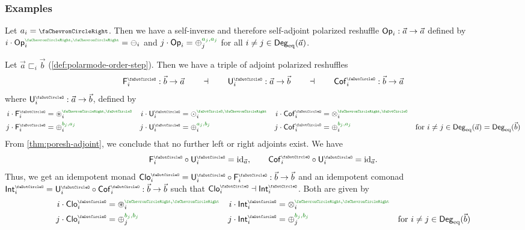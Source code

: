 \documentclass[a4paper]{memoir}
\begin{document}
\subsubsection{Examples}
\begin{example} \label{ex:poresh-op}
	Let $a_i = \ypolar$.
	Then we have a self-inverse and therefore self-adjoint polarized reshuffle ${\mathsf{Op}}_i : \vec a \to \vec a$ defined by $i \cdot \Op_i\pmrhom{\ypolar}{\ypolar} = \negpol_i$ and $j \cdot \Op_i = \pospol_j\pmrhom{a_j}{a_j}$ for all $i \neq j \in {\mathsf{Deg}_{\mathrm{eq}}}(\vec a)$.
\end{example}
\begin{example} \label{ex:poresh-sym}
	Let $\vec a \sqsubset_i \vec b$ (\cref{def:polarmode-order-step}).
	Then we have a triple of adjoint polarized reshuffles
	\[
		\Fsymresh_i : \vec b \to \vec a
		\qquad\dashv\qquad
		\Usymresh_i : \vec a \to \vec b
		\qquad\dashv\qquad
		\Csymresh_i : \vec b \to \vec a
	\]
	where $\Usymresh_i : \vec a \to \vec b$, defined by
	\begin{align*}
		i \cdot \Fsymresh_i &= \isopol_i\pmrhom{\ypolar}{\npolar}
		& i \cdot \Usymresh_i &= \nonpol_i\pmrhom{\npolar}{\ypolar}
		& i \cdot \Csymresh_i &= \mixpol_i\pmrhom{\ypolar}{\npolar}
		\\
		j \cdot \Fsymresh_i &= \pospol_i\pmrhom{b_j}{a_j}
		& j \cdot \Usymresh_i &= \pospol_i\pmrhom{a_j}{b_j}
		& j \cdot \Csymresh_i &= \pospol_i\pmrhom{b_j}{a_j}
		& \text{for $i \neq j \in \Degeq(\vec a) = \Degeq(\vec b)$}
	\end{align*}
	From \cref{thm:poresh-adjoint}, we conclude that no further left or right adjoints exist. We have
	\[
		\Fsymresh_i \circ \Usymresh_i = \id_{\vec a}, \qquad \Csymresh_i \circ \Usymresh_i = \id_{\vec a}.
	\]
	Thus, we get an idempotent monad $\UFsymresh_i = \Usymresh_i \circ \Fsymresh_i : \vec b \to \vec b$ and an idempotent comonad $\UCsymresh_i = \Usymresh_i \circ \Csymresh_i : \vec b \to \vec b$ such that $\UFsymresh_i \dashv \UCsymresh_i$.
	Both are given by
	\begin{align*}
		i \cdot \UFsymresh_i &= \isopol_i\pmrhom{\ypolar}{\ypolar}
		& i \cdot \UCsymresh_i &= \mixpol_i\pmrhom{\ypolar}{\ypolar}
		\\
		j \cdot \UFsymresh_i &= \pospol_j\pmrhom{b_j}{b_j}
		& j \cdot \UCsymresh_i &= \pospol_j\pmrhom{b_j}{b_j}
		& \text{for $i \neq j \in \Degeq(\vec b)$}
	\end{align*}
\end{example}
\end{document}
